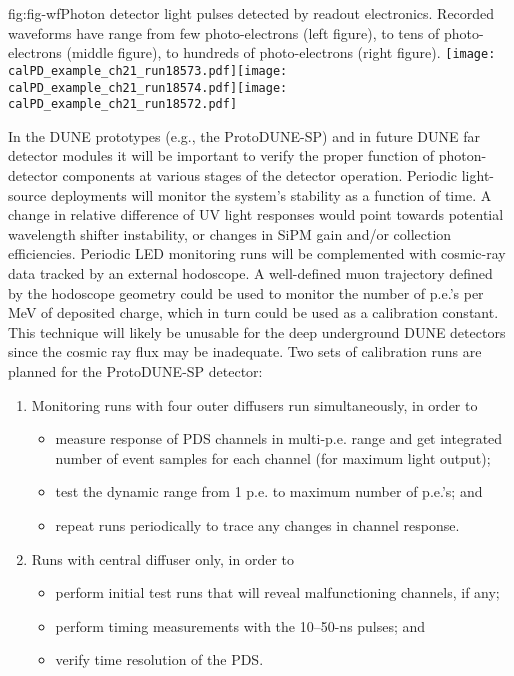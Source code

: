 %
 \begin{cdrfigure}{fig:fig-wf}{Photon detector light pulses detected by readout electronics. Recorded waveforms have range from few photo-electrons (left figure), to tens of photo-electrons (middle figure), to hundreds of photo-electrons (right figure).}
\texttt{[image: calPD\_example\_ch21\_run18573.pdf]}\texttt{[image: calPD\_example\_ch21\_run18574.pdf]}\texttt{[image: calPD\_example\_ch21\_run18572.pdf]}
\end{cdrfigure}
%
In the DUNE prototypes (e.g., the ProtoDUNE-SP) and in future DUNE far detector modules it will be important to 
verify the proper function of photon-detector components
at various stages of the detector operation. 
Periodic light-source deployments will monitor the system's stability as a function of time. A change in relative difference of UV light responses would point towards potential wavelength shifter instability, 
or changes in SiPM gain and/or collection efficiencies. %
Periodic LED monitoring runs will be complemented 
with cosmic-ray data tracked by an external hodoscope. 
A well-defined muon trajectory defined by the hodoscope geometry could be used to monitor the number of p.e.'s per MeV of deposited charge, which in turn 
could be used as a calibration constant. This technique will likely be unusable 
for the deep underground DUNE detectors since the cosmic ray flux may be inadequate. %
	Two sets of calibration runs are planned for the ProtoDUNE-SP detector: 
\begin{enumerate}
\item Monitoring runs with four outer diffusers run simultaneously, in order to
   \begin{itemize}
   \item measure response of PDS channels in multi-p.e. range and get integrated number of event samples for each channel (for maximum light output);
   \item test  the dynamic range from 1 p.e. to maximum number of p.e.'s; and
   \item repeat runs periodically to trace any changes in channel response.
    \end{itemize}
\item Runs with central diffuser only, in order to
   \begin{itemize}
   \item perform initial test runs that will reveal malfunctioning channels, if any;
   \item perform timing measurements with the 10--50-ns pulses; and
    \item verify time resolution of the PDS.
   \end{itemize}
\end{enumerate}

